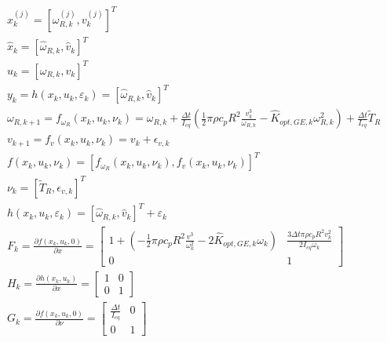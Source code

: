 \begin{gather}
  x^{(j)}_{k} = \left[\omega_{R,k}^{(j)}, v_{k}^{(j)}\right]^T \\
  \hat{x}_{k} = \left[\hat{\omega}_{R,k}, \hat{v}_{k}\right]^T \\
  u_{k} = \left[\omega_{R,k}, v_{k}\right]^T \\
  y_k = h(x_k, u_k, \varepsilon_k) = \left[\hat{\omega}_{R,k}, \hat{v}_{k}\right]^T \\
  \omega_{R,k+1} = f_{\omega_{R}}(x_k, u_k, \nu_k) = \omega_{R,k} + \frac{\Delta t}{I_{eq}} \left(\frac{1}{2}\pi\rho c_{p} R^2 \frac{v_k^3}{\omega_{R,k}} - \hat{K}_{opt,GE,k}\omega_{R,k}^2\right) + \frac{\Delta t}{I_{eq}}\tilde{T}_R\\
  v_{k+1} = f_{v}(x_k, u_k, \nu_k) = v_k + \epsilon_{v,k} \\
  f(x_k, u_k, \nu_k) = \left[f_{\omega_{R}}(x_k, u_k, \nu_k), f_{v}(x_k, u_k, \nu_k)\right]^T\\
  \nu_k = \left[\tilde{T}_R, \epsilon_{v,k}\right]^T\\
  h(x_k, u_k, \varepsilon_k) = \left[\hat{\omega}_{R,k}, \hat{v}_{k}\right]^T + \varepsilon_k\\
  F_k = \frac{\partial f(x_k, u_k, 0)}{\partial x} = 
    \begin{bmatrix}
      1+\left(-\frac{1}{2}\pi\rho c_{p} R^2 \frac{v^3}{\omega_k^2}-2 \hat{K}_{opt,GE,k} \omega_k\right) & \frac{3\Delta t \pi \rho c_p R^2 v_k^2}{2 I_{eq} \omega_k}\\
      0 & 1 
    \end{bmatrix}\\
  H_k = \frac{\partial h(x_k, u_k)}{\partial x}=
    \begin{bmatrix}
      1 & 0\\
      0 & 1 
    \end{bmatrix}\\
 G_k = \frac{\partial f(x_k, u_k, 0)}{\partial \nu} = 
  \begin{bmatrix}
    \frac{\Delta t}{I_{eq}} & 0\\
    0 & 1 
  \end{bmatrix}
\end{gather}
